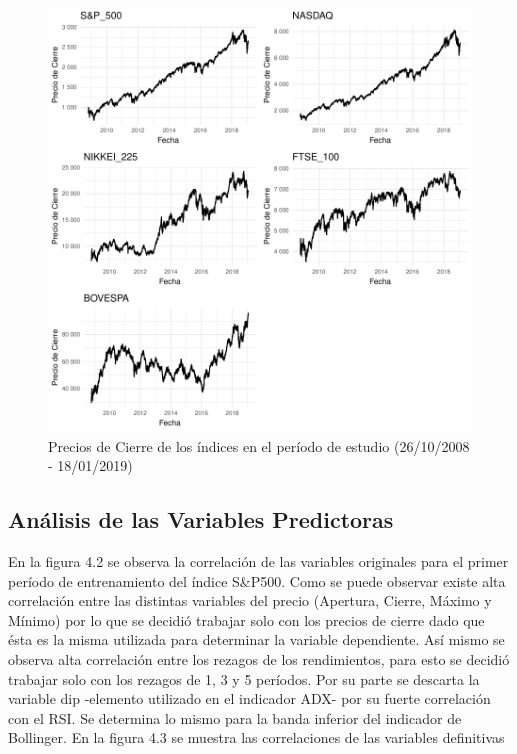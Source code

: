 \documentclass[a4paper,12pt]{Latex/Classes/PhDthesisPSnPDF}
\begin{document}
\begin{figure}[H]
\centering
\includegraphics{main-005}
\caption{Precios de Cierre de los índices en el período de estudio (26/10/2008 - 18/01/2019)}
\end{figure}


\subsection{Análisis de las Variables Predictoras}

En la figura 4.2 se observa la correlación de las variables originales para el primer período de entrenamiento del índice S\&P500. Como se puede observar existe alta correlación entre las distintas variables del precio (Apertura, Cierre, Máximo y Mínimo) por lo que se decidió trabajar solo con los precios de cierre dado que ésta es la misma utilizada para determinar la variable dependiente. Así mismo se observa alta correlación entre los rezagos de los rendimientos, para esto se decidió trabajar solo con los rezagos de 1, 3 y 5 períodos. Por su parte se descarta la variable dip -elemento utilizado en el indicador ADX- por su fuerte correlación con el RSI. Se determina lo mismo para la banda inferior del indicador de Bollinger. En la figura 4.3 se muestra las correlaciones de las variables definitivas
\end{document}
